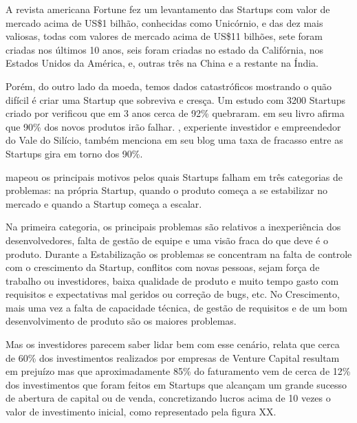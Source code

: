 A revista americana Fortune fez um levantamento das Startups com valor de mercado acima de US\$1 bilhão, conhecidas como Unicórnio, e das dez mais valiosas, todas com valores de mercado acima de US\$11 bilhões, sete foram criadas nos últimos 10 anos, seis foram criadas no estado da Califórnia, nos Estados Unidos da América, e, outras três na China e a restante na Índia.

Porém, do outro lado da moeda, temos dados catastróficos mostrando o quão difícil é criar uma Startup que sobreviva e cresça. Um estudo com 3200 Startups criado por  verificou que em 3 anos cerca de 92\% quebraram.  em seu livro afirma que 90\% dos novos produtos irão falhar. , experiente investidor e empreendedor do Vale do Silício, também menciona em seu blog uma taxa de fracasso entre as Startups gira em torno dos 90\%. 

 mapeou os principais motivos pelos quais Startups falham em três categorias de problemas: na própria Startup, quando o produto começa a se estabilizar no mercado e quando a Startup começa a escalar.

Na primeira categoria, os principais problemas são relativos a inexperiência dos desenvolvedores, falta de gestão de equipe e uma visão fraca do que deve é o produto. Durante a Estabilização os problemas se concentram na falta de controle com o crescimento da Startup, conflitos com novas pessoas, sejam força de trabalho ou investidores, baixa qualidade de produto e muito tempo gasto com requisitos e expectativas mal geridos ou correção de bugs, etc. No Crescimento, mais uma vez a falta de capacidade técnica, de gestão de requisitos e de um bom desenvolvimento de produto são os maiores problemas.

Mas os investidores parecem saber lidar bem com esse cenário,  relata que cerca de 60\% dos investimentos realizados por empresas de Venture Capital resultam em prejuízo mas que aproximadamente 85\% do faturamento vem de cerca de 12\% dos investimentos que foram feitos em Startups que alcançam um grande sucesso de abertura de capital ou de venda, concretizando lucros acima de 10 vezes o valor de investimento inicial, como representado pela figura XX. 

